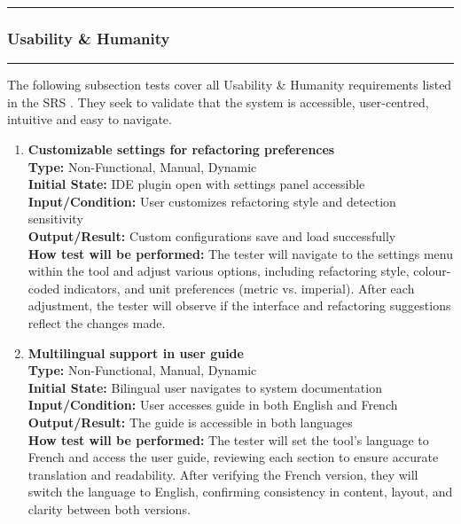 \documentclass[12pt, titlepage]{article}
\newcommand{\colorrule}{\textcolor{BlueViolet}{\rule{\linewidth}{2pt}}}
\begin{document}
\noindent
\colorrule
    
\subsubsection{Usability \& Humanity}

\colorrule

\medskip

\noindent
The following subsection tests cover all Usability \& Humanity requirements listed in the SRS \cite{SRS}. They seek to validate that the system is accessible, user-centred, intuitive and easy to navigate.

\begin{enumerate}[label={\bf \textcolor{Maroon}{test-UH-\arabic*}}, wide=0pt, font=\itshape]
  \item \textbf{Customizable settings for refactoring preferences} \\[2mm]
    \textbf{Type:} Non-Functional, Manual, Dynamic \\
    \textbf{Initial State:} IDE plugin open with settings panel accessible \\
    \textbf{Input/Condition:} User customizes refactoring style and detection sensitivity \\
    \textbf{Output/Result:} Custom configurations save and load successfully \\[2mm]
    \textbf{How test will be performed:} The tester will navigate to the settings menu within the tool and adjust various options, including refactoring style, colour-coded indicators, and unit preferences (metric vs. imperial). After each adjustment, the tester will observe if the interface and refactoring suggestions reflect the changes made. 

  \item \textbf{Multilingual support in user guide} \\[2mm]
    \textbf{Type:} Non-Functional, Manual, Dynamic \\ 
    \textbf{Initial State:} Bilingual user navigates to system documentation \\
    \textbf{Input/Condition:} User accesses guide in both English and French \\
    \textbf{Output/Result:} The guide is accessible in both languages \\[2mm]
    \textbf{How test will be performed:} The tester will set the tool’s language to French and access the user guide, reviewing each section to ensure accurate translation and readability. After verifying the French version, they will switch the language to English, confirming consistency in content, layout, and clarity between both versions.


\end{enumerate}
\end{document}
